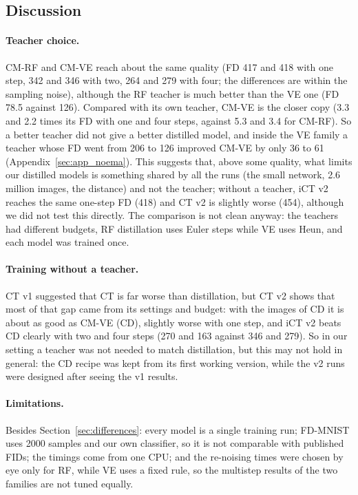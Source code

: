 \documentclass{article}
\begin{document}
\subsection{Discussion}

\paragraph{Teacher choice.} CM-RF and CM-VE reach about the same quality (FD 417
and 418 with one step, 342 and 346 with two, 264 and 279 with four; the
differences are within the sampling noise), although the RF teacher is much
better than the VE one (FD 78.5 against 126). Compared with its own teacher,
CM-VE is the closer copy (3.3 and 2.2 times its FD with one and four steps,
against 5.3 and 3.4 for CM-RF). So a better teacher did not give a better
distilled model, and inside the VE family a teacher whose FD went from 206 to 126
improved CM-VE by only 36 to 61 (Appendix~\ref{sec:app_noema}). This suggests that,
above some quality, what limits our distilled models is something shared by all
the runs (the small network, 2.6 million images, the distance) and not the
teacher; without a teacher, iCT v2 reaches the same one-step FD (418) and CT v2 is
slightly worse (454), although we did not test this directly. The comparison is not clean anyway:
the teachers had different budgets, RF distillation uses Euler steps while VE uses
Heun, and each model was trained once.

\paragraph{Training without a teacher.} CT v1 suggested that CT is far worse than
distillation, but CT v2 shows that most of that gap came from its settings and
budget: with the images of CD it is about as good as CM-VE (CD), slightly worse
with one step, and iCT v2 beats CD clearly with two and four steps (270 and 163
against 346 and 279). So in our setting a teacher was not needed to match
distillation, but this may not hold in general: the CD recipe was kept from its
first working version, while the v2 runs were designed after seeing the v1 results.

\paragraph{Limitations.} Besides Section~\ref{sec:differences}: every model is
a single training run; FD-MNIST uses 2000 samples and our own classifier, so it is
not comparable with published FIDs; the timings come from one CPU; and the
re-noising times were chosen by eye only for RF, while VE uses a fixed rule, so
the multistep results of the two families are not tuned equally.
\end{document}
